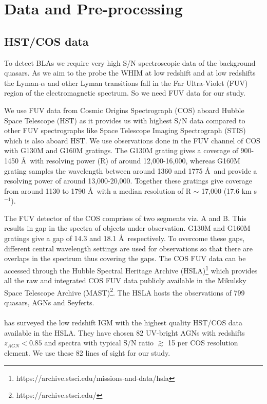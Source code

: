 \chapter{Data and Pre-processing}  \label{chap:data}

\section{HST/COS data}

To detect BLAs we require very high S/N spectroscopic data of the background quasars. As we aim to the probe the WHIM at low redshift and at low redshifts the Lyman-$\alpha$ and other Lyman transitions fall in the Far Ultra-Violet (FUV) region of the electromagnetic spectrum. So we need FUV data for our study. 

We use FUV data from Cosmic Origins Spectrograph (COS) aboard Hubble Space Telescope (HST) as it provides us with highest S/N data compared to other FUV spectrographs like Space Telescope Imaging Spectrograph (STIS) which is also aboard HST. We use observations done in the FUV channel of COS with G130M and G160M gratings. The G130M grating gives a coverage of 900-1450 \AA \ with resolving power (R) of around 12,000-16,000, whereas G160M grating samples the wavelength between around 1360 and 1775 \AA \ and provide a resolving power of around 13,000-20,000. Together these gratings give coverage from around 1130 to 1790 \AA \ with a median resolution of R $\sim$ 17,000 (17.6 km s$^{-1}$).

The FUV detector of the COS comprises of two segments viz. A and B. This results in gap in the spectra of objects under observation. G130M and G160M gratings give a gap of 14.3  and 18.1 \AA \ respectively. To overcome these gaps, different central wavelength settings are used for observations so that there are overlaps in the spectrum thus covering the gaps. The COS FUV data can be accessed through the Hubble Spectral Heritage Archive (HSLA)\footnote{https://archive.stsci.edu/missions-and-data/hsla} which provides all the raw and integrated COS FUV data publicly available in the Mikulsky Space Telescope Archive (MAST)\footnote{https://archive.stsci.edu/}. The HSLA hosts the observations of 799 quasars, AGNs and Seyferts.
\\\\
\citet{danforth-2016} has surveyed the low redshift IGM with the highest quality HST/COS data available in the HSLA. They have chosen 82 UV-bright AGNs with redshifts $z_{AGN}<0.85$ and spectra with typical S/N ratio $\gtrsim$ 15 per COS resolution element. We use these 82 lines of sight for our study.  


